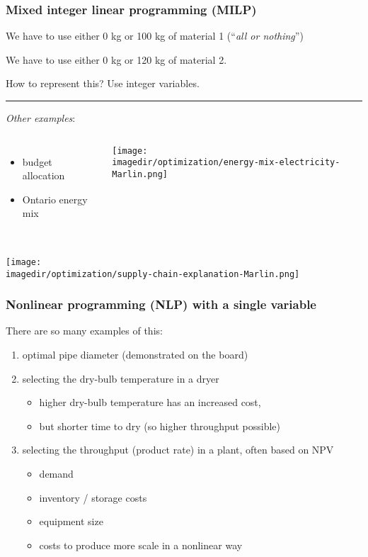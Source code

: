 \begin{frame}\frametitle{Mixed integer linear programming (MILP)}
	We have to use either 0 kg or 100 kg of material 1 {\small (``\emph{all or nothing}'')}
	
	We have to use either 0 kg or 120 kg of material 2.
	
	\vspace{12pt}
	How to represent this? Use integer variables.
	
	\vspace{3cm}
	\hrule
	\vspace{2pt}
	
	\emph{Other examples}: 
	
	
	
	\begin{columns}[c]
			\begin{itemize}
				\item	budget allocation
				\item	Ontario energy mix
			\end{itemize}
			
			\centerline{\texttt{[image: \\imagedir/optimization/energy-mix-electricity-Marlin.png]}}
			
	\end{columns}
\end{frame}

\begin{frame}\frametitle{}
	\centerline{\texttt{[image: \\imagedir/optimization/supply-chain-explanation-Marlin.png]}}
\end{frame}


\begin{frame}\frametitle{Nonlinear programming (NLP) with a single variable}
	There are so many examples of this:
	\begin{enumerate}
		\item	optimal pipe diameter (demonstrated on the board)
		
		\item	selecting the dry-bulb temperature in a dryer
			\begin{itemize}
				\item	higher dry-bulb temperature has an increased cost, 
				\item	but shorter time to dry (so higher throughput possible)
			\end{itemize}
		\item	selecting the throughput (product rate) in a plant, often based on NPV
			\begin{itemize}
				\item	demand
				\item	inventory / storage costs
				\item	equipment size
				\item	costs to produce more scale in a nonlinear way
			\end{itemize}
	\end{enumerate}
\end{frame}

